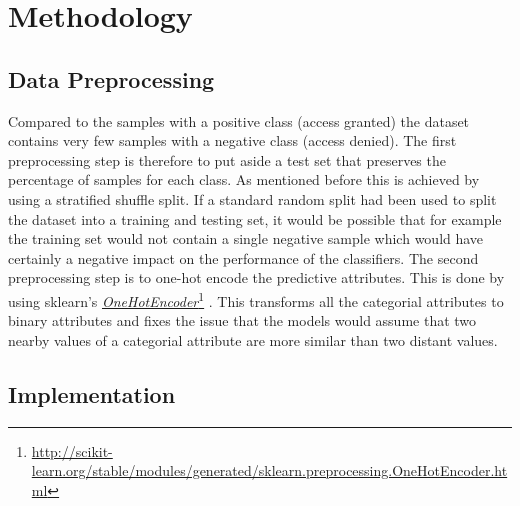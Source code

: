 \documentclass[11pt]{article}
\newcommand\fnurl[2]{%
\href{#2}{#1}\footnote{\url{#2}}%
}
\begin{document}
\section{Methodology}

\subsection{Data Preprocessing}

Compared to the samples with a positive
class (access granted) the dataset contains very few samples with a negative class
(access denied). The first preprocessing step is therefore to put aside a test set 
that preserves the percentage of samples for each class. As mentioned before this is 
achieved by using a stratified shuffle split.
If a standard random split had been used to
split the dataset into a training and testing set, it would be possible that
for example the training set would not contain a single negative sample which
would have certainly a negative impact on the performance of the classifiers.
The second preprocessing step is to one-hot encode the predictive attributes.
This is done by using sklearn's
\fnurl{{\it OneHotEncoder}}{http://scikit-learn.org/stable/modules/generated/sklearn.preprocessing.OneHotEncoder.html}.
This transforms all the categorial attributes to binary attributes and fixes the
issue that the models would assume that two nearby values of a categorial
attribute are more similar than two distant values.
\newpage
\subsection{Implementation}
\end{document}
